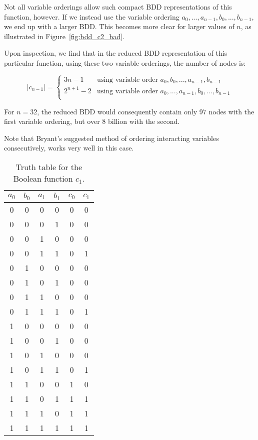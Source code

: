 \documentclass[a4paper,11pt]{kth-mag}
\begin{document}
Not all variable orderings allow such compact BDD representations of this function, however.
If we instead use the variable ordering $a_0,...,a_{n-1},b_0,...,b_{n-1}$, we end up with a larger BDD.
This becomes more clear for larger values of $n$, as illustrated in Figure~\ref{fig:bdd_c2_bad}.

Upon inspection, we find that in the reduced BDD representation of this particular function, using these two variable orderings, the number of nodes is:

$$
  |c_{n-1}| = \left\{
  \begin{array}{ll}
    3n-1      & \textrm{using variable order $a_0,b_0,...,a_{n-1},b_{n-1}$} \\
    2^{n+1}-2 & \textrm{using variable order $a_0,...,a_{n-1},b_0,...,b_{n-1}$} \\
  \end{array}\right.
$$

For $n = 32$, the reduced BDD would consequently contain only 97 nodes with the first variable ordering, but over 8 billion with the second.

Note that Bryant's suggested method of ordering interacting variables consecutively, works very well in this case.

\begin{table}[p]
\centering
\tiny
\begin{tabular}{cccc|cc}
$a_0$ & $b_0$ & $a_1$ & $b_1$ & $c_0$ & $c_1$ \\
\hline
0     & 0     & 0     & 0     & 0     & 0 \\
0     & 0     & 0     & 1     & 0     & 0 \\
0     & 0     & 1     & 0     & 0     & 0 \\
0     & 0     & 1     & 1     & 0     & 1 \\
0     & 1     & 0     & 0     & 0     & 0 \\
0     & 1     & 0     & 1     & 0     & 0 \\
0     & 1     & 1     & 0     & 0     & 0 \\
0     & 1     & 1     & 1     & 0     & 1 \\
1     & 0     & 0     & 0     & 0     & 0 \\
1     & 0     & 0     & 1     & 0     & 0 \\
1     & 0     & 1     & 0     & 0     & 0 \\
1     & 0     & 1     & 1     & 0     & 1 \\
1     & 1     & 0     & 0     & 1     & 0 \\
1     & 1     & 0     & 1     & 1     & 1 \\
1     & 1     & 1     & 0     & 1     & 1 \\
1     & 1     & 1     & 1     & 1     & 1 \\
\end{tabular}
\caption{Truth table for the Boolean function $c_1$.}
\label{tab:tt_c1}
\end{table}
\end{document}

